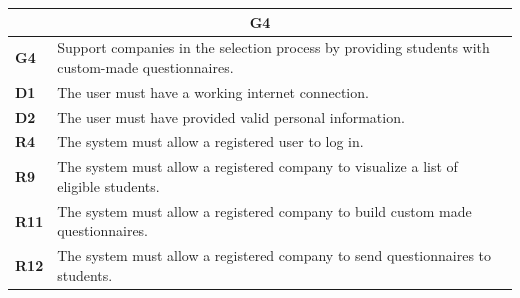 \begin{table}[H]
    \centering
    \begin{tabular}{|l|m{10cm}|}
        \hline \multicolumn{2}{|c|}{\textbf{G4}} \\
        \hline \textbf{G4} & Support companies in the selection process by providing students with custom-made questionnaires. \\
        \hline \textbf{D1} & The user must have a working internet connection. \\
        \hline \textbf{D2} & The user must have provided valid personal information. \\
        \hline \textbf{R4} & The system must allow a registered user to log in. \\
        \hline \textbf{R9} & The system must allow a registered company to visualize a list of eligible students. \\
        \hline \textbf{R11} & The system must allow a registered company to build custom made questionnaires. \\
        \hline \textbf{R12} & The system must allow a registered company to send questionnaires to students. \\

\end{tabular}
\end{table}
